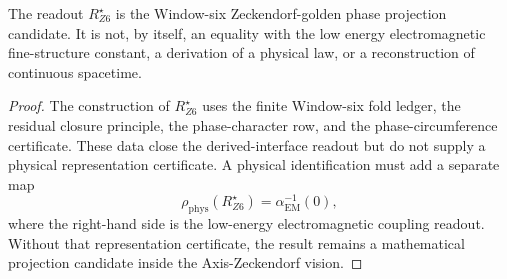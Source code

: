 \begin{theorem}
\label{thm:zeckendorf-window-six-readout-candidate-boundary}
The readout \(R_{Z6}^\star\) is the Window-six Zeckendorf-golden phase
projection candidate. It is not, by itself, an equality with the low
energy electromagnetic fine-structure constant, a derivation of a
physical law, or a reconstruction of continuous spacetime.
\end{theorem}
\begin{proof}
The construction of \(R_{Z6}^\star\) uses the finite Window-six fold
ledger, the residual closure principle, the phase-character row, and the
phase-circumference certificate. These data close the derived-interface
readout but do not supply a physical representation certificate. A
physical identification must add a separate map
$$
  \rho_{\mathrm{phys}}(R_{Z6}^\star)
  =
  \alpha_{\mathrm{EM}}^{-1}(0),
$$
where the right-hand side is the low-energy electromagnetic coupling
readout. Without that representation certificate, the result remains a
mathematical projection candidate inside the Axis-Zeckendorf vision.
\end{proof}



